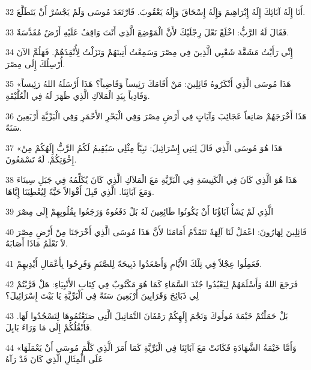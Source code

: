 \par 32 أَنَا إِلَهُ آبَائِكَ إِلَهُ إِبْرَاهِيمَ وَإِلَهُ إِسْحَاقَ وَإِلَهُ يَعْقُوبَ. فَارْتَعَدَ مُوسَى وَلَمْ يَجْسُرْ أَنْ يَتَطَلَّعَ.
\par 33 فَقَالَ لَهُ الرَّبُّ: اخْلَعْ نَعْلَ رِجْلَيْكَ لأَنَّ الْمَوْضِعَ الَّذِي أَنْتَ وَاقِفٌ عَلَيْهِ أَرْضٌ مُقَدَّسَةٌ.
\par 34 إِنِّي رَأَيْتُ مَشَقَّةَ شَعْبِي الَّذِينَ فِي مِصْرَ وَسَمِعْتُ أَنِينَهُمْ وَنَزَلْتُ لِأُنْقِذَهُمْ. فَهَلُمَّ الآنَ أُرْسِلُكَ إِلَى مِصْرَ.
\par 35 «هَذَا مُوسَى الَّذِي أَنْكَرُوهُ قَائِلِينَ: مَنْ أَقَامَكَ رَئِيساً وَقَاضِياً؟ هَذَا أَرْسَلَهُ اللهُ رَئِيساً وَفَادِياً بِيَدِ الْمَلاَكِ الَّذِي ظَهَرَ لَهُ فِي الْعُلَّيْقَةِ.
\par 36 هَذَا أَخْرَجَهُمْ صَانِعاً عَجَائِبَ وَآيَاتٍ فِي أَرْضِ مِصْرَ وَفِي الْبَحْرِ الأَحْمَرِ وَفِي الْبَرِّيَّةِ أَرْبَعِينَ سَنَةً.
\par 37 «هَذَا هُوَ مُوسَى الَّذِي قَالَ لِبَنِي إِسْرَائِيلَ: نَبِيّاً مِثْلِي سَيُقِيمُ لَكُمُ الرَّبُّ إِلَهُكُمْ مِنْ إِخْوَتِكُمْ. لَهُ تَسْمَعُونَ.
\par 38 هَذَا هُوَ الَّذِي كَانَ فِي الْكَنِيسَةِ فِي الْبَرِّيَّةِ مَعَ الْمَلاَكِ الَّذِي كَانَ يُكَلِّمُهُ فِي جَبَلِ سِينَاءَ وَمَعَ آبَائِنَا. الَّذِي قَبِلَ أَقْوَالاً حَيَّةً لِيُعْطِيَنَا إِيَّاهَا.
\par 39 الَّذِي لَمْ يَشَأْ آبَاؤُنَا أَنْ يَكُونُوا طَائِعِينَ لَهُ بَلْ دَفَعُوهُ وَرَجَعُوا بِقُلُوبِهِمْ إِلَى مِصْرَ
\par 40 قَائِلِينَ لِهَارُونَ: اعْمَلْ لَنَا آلِهَةً تَتَقَدَّمُ أَمَامَنَا لأَنَّ هَذَا مُوسَى الَّذِي أَخْرَجَنَا مِنْ أَرْضِ مِصْرَ لاَ نَعْلَمُ مَاذَا أَصَابَهُ.
\par 41 فَعَمِلُوا عِجْلاً فِي تِلْكَ الأَيَّامِ وَأَصْعَدُوا ذَبِيحَةً لِلصَّنَمِ وَفَرِحُوا بِأَعْمَالِ أَيْدِيهِمْ.
\par 42 فَرَجَعَ اللهُ وَأَسْلَمَهُمْ لِيَعْبُدُوا جُنْدَ السَّمَاءِ كَمَا هُوَ مَكْتُوبٌ فِي كِتَابِ الأَنْبِيَاءِ: هَلْ قَرَّبْتُمْ لِي ذَبَائِحَ وَقَرَابِينَ أَرْبَعِينَ سَنَةً فِي الْبَرِّيَّةِ يَا بَيْتَ إِسْرَائِيلَ؟
\par 43 بَلْ حَمَلْتُمْ خَيْمَةَ مُولُوكَ وَنَجْمَ إِلَهِكُمْ رَمْفَانَ التَّمَاثِيلَ الَّتِي صَنَعْتُمُوهَا لِتَسْجُدُوا لَهَا. فَأَنْقُلُكُمْ إِلَى مَا وَرَاءَ بَابِلَ.
\par 44 «وَأَمَّا خَيْمَةُ الشَّهَادَةِ فَكَانَتْ مَعَ آبَائِنَا فِي الْبَرِّيَّةِ كَمَا أَمَرَ الَّذِي كَلَّمَ مُوسَى أَنْ يَعْمَلَهَا عَلَى الْمِثَالِ الَّذِي كَانَ قَدْ رَآهُ
